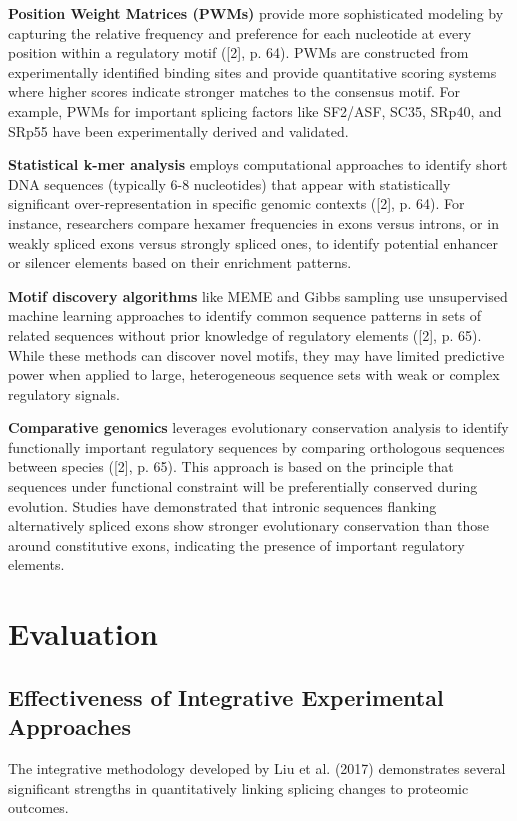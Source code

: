 \documentclass[12pt,a4paper]{article}
\begin{document}
\textbf{Position Weight Matrices (PWMs)} provide more sophisticated modeling by capturing the relative frequency and preference for each nucleotide at every position within a regulatory motif ([2], p. 64). PWMs are constructed from experimentally identified binding sites and provide quantitative scoring systems where higher scores indicate stronger matches to the consensus motif. For example, PWMs for important splicing factors like SF2/ASF, SC35, SRp40, and SRp55 have been experimentally derived and validated.

\textbf{Statistical k-mer analysis} employs computational approaches to identify short DNA sequences (typically 6-8 nucleotides) that appear with statistically significant over-representation in specific genomic contexts ([2], p. 64). For instance, researchers compare hexamer frequencies in exons versus introns, or in weakly spliced exons versus strongly spliced ones, to identify potential enhancer or silencer elements based on their enrichment patterns.

\textbf{Motif discovery algorithms} like MEME and Gibbs sampling use unsupervised machine learning approaches to identify common sequence patterns in sets of related sequences without prior knowledge of regulatory elements ([2], p. 65). While these methods can discover novel motifs, they may have limited predictive power when applied to large, heterogeneous sequence sets with weak or complex regulatory signals.

\textbf{Comparative genomics} leverages evolutionary conservation analysis to identify functionally important regulatory sequences by comparing orthologous sequences between species ([2], p. 65). This approach is based on the principle that sequences under functional constraint will be preferentially conserved during evolution. Studies have demonstrated that intronic sequences flanking alternatively spliced exons show stronger evolutionary conservation than those around constitutive exons, indicating the presence of important regulatory elements.

\section{Evaluation}

\subsection{Effectiveness of Integrative Experimental Approaches}

The integrative methodology developed by Liu et al. (2017) demonstrates several significant strengths in quantitatively linking splicing changes to proteomic outcomes.
\end{document}
